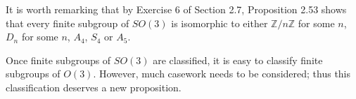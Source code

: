 \documentclass[leqno]{book}
\begin{document}
\noindent It is worth remarking that by Exercise 6 of Section 2.7, Proposition 2.53 shows that every finite subgroup of $SO(3)$ is isomorphic to either $\mathbb Z/n\mathbb Z$ for some $n$, $D_n$ for some $n$, $A_4$, $S_4$ or $A_5$.

Once finite subgroups of $SO(3)$ are classified, it is easy to classify finite subgroups of $O(3)$.  However, much casework needs to be considered; thus this classification deserves a new proposition.\\
\end{document}
